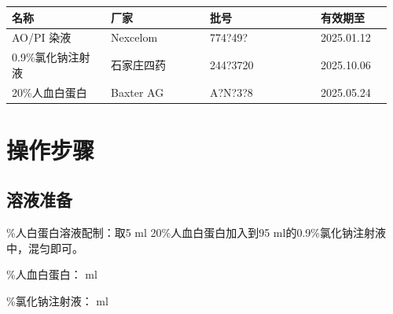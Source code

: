\documentclass[UTF8,10pt,a4paper,fontset=fandol]{ctexart}
\newcommand{\fieldvalue}[1]{#1}
\newcommand{\handwritten}[1]{#1}
\begin{document}
\begin{center}
\small
\begin{tabular}{|p{0.25\linewidth}|p{0.25\linewidth}|p{0.28\linewidth}|p{0.18\linewidth}|}
\hline
名称 & 厂家 & 批号 & 有效期至 \\
\hline
\fieldvalue{AO/PI 染液} &
\fieldvalue{Nexcelom} &
\fieldvalue{\handwritten{774?49?}} &
\fieldvalue{\handwritten{2025.01.12}} \\
\hline
\fieldvalue{0.9\%氯化钠注射液} &
\fieldvalue{石家庄四药} &
\fieldvalue{\handwritten{244?3720}} &
\fieldvalue{\handwritten{2025.10.06}} \\
\hline
\fieldvalue{20\%人血白蛋白} &
\fieldvalue{Baxter AG} &
\fieldvalue{\handwritten{A?N?3?8}} &
\fieldvalue{\handwritten{2025.05.24}} \\
\hline
\end{tabular}
\end{center}

\section{操作步骤}

\subsection*{溶液准备}

\%人白蛋白溶液配制：取5 ml 20\%人血白蛋白加入到95 ml的0.9\%氯化钠注射液中，混匀即可。

\%人血白蛋白：\underline{\hspace{1.5cm}} ml

\%氯化钠注射液：\underline{\hspace{1.5cm}} ml
\end{document}
